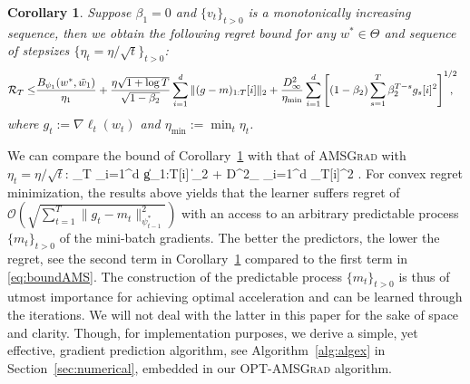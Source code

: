 \documentclass[11pt]{article}
\newtheorem{Corollary}{Corollary}
\theoremstyle{k}
\begin{document}
\begin{Corollary}\label{cor:corollary}
Suppose $\beta_1=0$ and $\{v_t\}_{t>0}$ is a monotonically increasing sequence, then we obtain the following regret bound for any $w^{*} \in \Theta$ and sequence of stepsizes $\{ \eta_t = \eta/\sqrt{t}\}_{t>0}$: 
\begin{equation}\notag
\begin{aligned}
\mathcal{R}_T \leq & \frac{ B_{\psi_1}(w^*, \tilde{w}_{1})}{\eta_1}
+ \frac{\eta \sqrt{1 + \log T}}{\sqrt{1 - \beta_2}} \sum_{i=1}^d \| (g-m)_{1:T}[i] \|_2 +\frac{D_{\infty}^2}{\eta_{\min}} \sum_{i=1}^d \left[ (1-\beta_2) \sum_{s=1}^{T} \beta_2^{T-s} g_s[i]^2 \right]^{1/2} \hspace{-0.3cm},
\end{aligned}
\end{equation}
where $g_{t}:= \nabla \ell_{t}(w_t)$ and $\eta_{{\min}} := \min_{{t}} \eta_{t}$.
\end{Corollary}
We can compare the bound of Corollary~\ref{cor:corollary} with that of \textsc{AMSGrad} \citep{RKK18} with $\eta_t = \eta/\sqrt{t}$:
\beq\label{eq:boundAMS}
_T \leq {} \sum_{i=1}^d \| g_{1:T}[i]  \|_2 + D^2_{\infty} \sum_{i=1}^d _T[i]^2 \eqsp.
\eeq
For convex regret minimization, the results above yields that the learner suffers regret of $\mathcal{O}(\sqrt{\sum_{t=1}^T \| g_t - m_t  \|^2_{\psi^*_{t-1}}})$ with an access to an arbitrary predictable process $\{m_t\}_{t>0}$ of the mini-batch gradients. 
The better the predictors, the lower the regret, see the second term in Corollary~\ref{cor:corollary} compared to the first term in \eqref{eq:boundAMS}.
The construction of the predictable process $\{m_t\}_{t>0}$ is thus of utmost importance for achieving optimal acceleration and can be learned through the iterations.
We will not deal with the latter in this paper for the sake of space and clarity.
Though, for implementation purposes, we derive a simple, yet effective, gradient prediction algorithm, see Algorithm~\ref{alg:algex} in Section~\ref{sec:numerical}, embedded in our \textsc{OPT-AMSGrad} algorithm.
\end{document}
